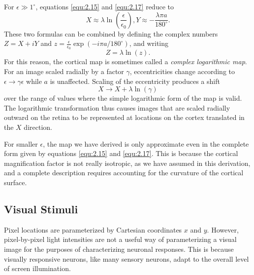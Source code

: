 \begin{exm}
  For $\epsilon \gg 1^{\circ}$, equations \ref{equ:2.15} and \ref{equ:2.17} reduce to
  \begin{displaymath}
    X \approx \lambda\ln(\frac{\epsilon}{\epsilon_0}),
    Y \approx -\frac{\lambda \pi a}{180^{\circ}}.
  \end{displaymath}
  These two formulas can be combined by defining the complex numbers
  $Z = X+iY$ and $z = \frac{\epsilon}{\epsilon_0}\exp\left(-i\pi a/180^{\circ}\right)$, and writing
  \begin{displaymath}
    Z = \lambda\ln(z).
  \end{displaymath}
  For this reason, the cortical map is sometimes called a \emph{complex logarithmic map}.
  For an image scaled radially by a factor $\gamma$, eccentricities change according to $\epsilon \to \gamma \epsilon$ while $a$ is unaffected. Scaling of the eccentricity produces a shift
  \begin{displaymath}
    X \to X+\lambda\ln(\gamma)
  \end{displaymath}
  over the range of values where the simple logarithmic form of the map is valid. The logarithmic transformation thus causes images that are scaled radially outward on the retina to be represented at locations on the cortex translated in the $X$ direction.
\end{exm}

\begin{rem}
  For smaller $\epsilon$, the map we have derived is only approximate even in the complete form given by equations \ref{equ:2.15} and \ref{equ:2.17}. This is because the cortical magnification factor is not really isotropic, as we have assumed in this derivation, and a complete description requires accounting for the curvature of the cortical surface.
\end{rem}

\subsection{Visual Stimuli}
\label{sec:visualStimuli}
\begin{rem}
  Pixel locations are parameterized by Cartesian coordinates $x$ and $y$. However, pixel-by-pixel light intensities are not a useful way of parameterizing a visual image for the purposes of characterizing neuronal responses. This is because visually responsive neurons, like many sensory neurons, adapt to the overall level of screen illumination.
\end{rem}

